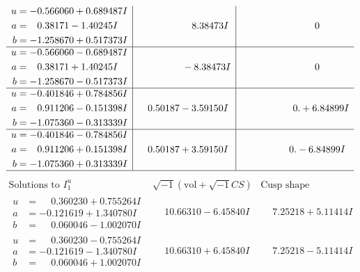 \documentclass[1p]{elsarticle_modified}
\theoremstyle{definition}
\newcommand{\I}{\sqrt{-1}}
\begin{document}
$$\begin{array}{c|c|c}
\begin{aligned}
u &= -0.566060 + 0.689487 I \\
a &= \phantom{-}0.38171 - 1.40245 I \\
b &= -1.258670 + 0.517373 I\end{aligned}
 & \phantom{-0.000000 -}8.38473 I & \phantom{-0.000000 } 0 \\ \hline\begin{aligned}
u &= -0.566060 - 0.689487 I \\
a &= \phantom{-}0.38171 + 1.40245 I \\
b &= -1.258670 - 0.517373 I\end{aligned}
 & \phantom{-0.000000 } -8.38473 I & \phantom{-0.000000 } 0 \\ \hline\begin{aligned}
u &= -0.401846 + 0.784856 I \\
a &= \phantom{-}0.911206 - 0.151398 I \\
b &= -1.075360 - 0.313339 I\end{aligned}
 & \phantom{-}0.50187 - 3.59150 I & \phantom{-0.000000 -}0. + 6.84899 I \\ \hline\begin{aligned}
u &= -0.401846 - 0.784856 I \\
a &= \phantom{-}0.911206 + 0.151398 I \\
b &= -1.075360 + 0.313339 I\end{aligned}
 & \phantom{-}0.50187 + 3.59150 I & \phantom{-0.000000 } 0. - 6.84899 I\\
 \hline 
 \end{array}$$\newpage$$\begin{array}{c|c|c}  
\text{Solutions to }I^u_{1}& \I (\text{vol} + \sqrt{-1}CS) & \text{Cusp shape}\\
 \hline 
\begin{aligned}
u &= \phantom{-}0.360230 + 0.755264 I \\
a &= -0.121619 + 1.340780 I \\
b &= \phantom{-}0.060046 - 1.002070 I\end{aligned}
 & \phantom{-}10.66310 - 6.45840 I & \phantom{-}7.25218 + 5.11414 I \\ \hline\begin{aligned}
u &= \phantom{-}0.360230 - 0.755264 I \\
a &= -0.121619 - 1.340780 I \\
b &= \phantom{-}0.060046 + 1.002070 I\end{aligned}
 & \phantom{-}10.66310 + 6.45840 I & \phantom{-}7.25218 - 5.11414 I \\ \hline\begin{aligned}

\end{aligned}
\end{array}$$
\end{document}
